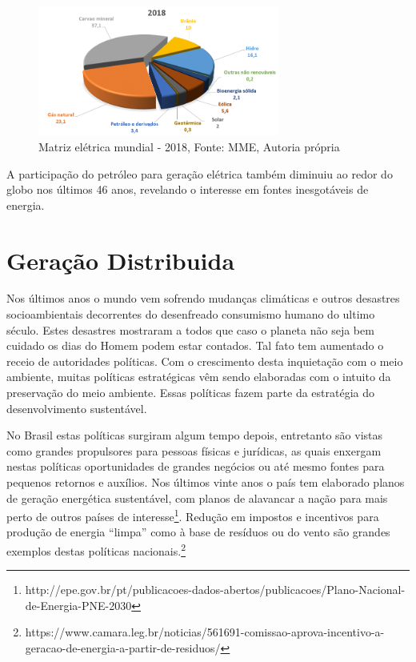 \documentclass[
]{article}
\begin{document}
\begin{figure}
\hypertarget{fig:mundo_18}{%
\centering
\includegraphics[width=3.125in,height=\textheight]{img/matriz/mundo_18.png}
\caption{Matriz elétrica mundial - 2018, Fonte: MME, Autoria
própria}\label{fig:mundo_18}
}
\end{figure}

A participação do petróleo para geração elétrica também diminuiu ao
redor do globo nos últimos 46 anos, revelando o interesse em fontes
inesgotáveis de energia.

\hypertarget{gerauxe7uxe3o-distribuida}{%
\section{Geração Distribuida}\label{gerauxe7uxe3o-distribuida}}

Nos últimos anos o mundo vem sofrendo mudanças climáticas e outros
desastres socioambientais decorrentes do desenfreado consumismo humano
do ultimo século. Estes desastres mostraram a todos que caso o planeta
não seja bem cuidado os dias do Homem podem estar contados. Tal fato tem
aumentado o receio de autoridades políticas. Com o crescimento desta
inquietação com o meio ambiente, muitas políticas estratégicas vêm sendo
elaboradas com o intuito da preservação do meio ambiente. Essas
políticas fazem parte da estratégia do desenvolvimento sustentável.

No Brasil estas políticas surgiram algum tempo depois, entretanto são
vistas como grandes propulsores para pessoas físicas e jurídicas, as
quais enxergam nestas políticas oportunidades de grandes negócios ou até
mesmo fontes para pequenos retornos e auxílios. Nos últimos vinte anos o
país tem elaborado planos de geração energética sustentável, com planos
de alavancar a nação para mais perto de outros países de
interesse\footnote{http://epe.gov.br/pt/publicacoes-dados-abertos/publicacoes/Plano-Nacional-de-Energia-PNE-2030}.
Redução em impostos e incentivos para produção de energia ``limpa'' como
à base de resíduos ou do vento são grandes exemplos destas políticas
nacionais.\footnote{https://www.camara.leg.br/noticias/561691-comissao-aprova-incentivo-a-geracao-de-energia-a-partir-de-residuos/}
\end{document}
